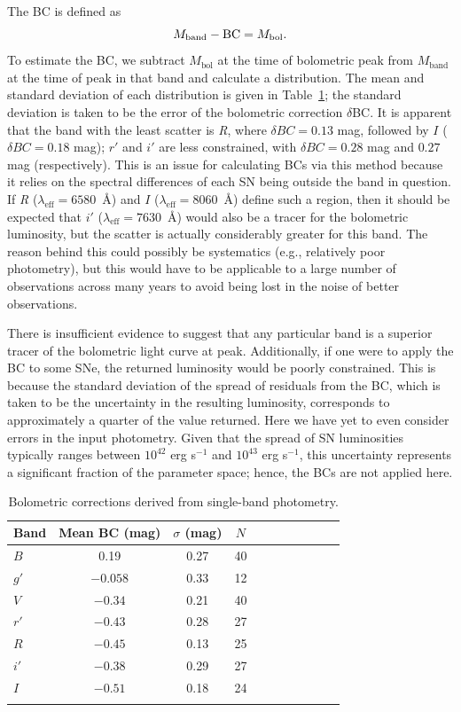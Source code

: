 \documentclass[a4paper,fleqn,usenatbib]{mnras}
\begin{document}
The BC is defined as 
\begin{equation}
M_{\mathrm{band}}-{\rm BC}=M_{\mathrm{bol}}.
\label{eq:BC}
\end{equation}
To estimate the BC, we subtract $M_{\mathrm{bol}}$ at the time of bolometric peak from $M_{\mathrm{band}}$ at the time of peak in that band and calculate a distribution.
The mean and standard deviation of each distribution is given in Table~\ref{BC}; the standard deviation is taken to be the error of the bolometric correction $\delta$BC. It is apparent that the band with the least scatter is \textit{R}, where $\delta BC=0.13$ mag, followed by $I$ ($\delta BC=0.18$ mag); $r'$ and $i'$ are less constrained, with $\delta BC=0.28$ mag and $0.27$ mag (respectively). This is an issue for calculating BCs via this method because it relies on the spectral differences of each SN being outside the band in question. If {\it R} ($\lambda_{\mathrm{eff}}=6580$~\AA) and $I$ ($\lambda_{\mathrm{eff}}=8060$~\AA) define such a region, then it should be expected that $i'$ ($\lambda_{\mathrm{eff}}=7630$~\AA) would also be a tracer for the bolometric luminosity, but the scatter is actually considerably greater for this band. The reason behind this could possibly be systematics (e.g., relatively poor photometry), but this would have to be applicable to a large number of observations across many years to avoid being lost in the noise of better observations.
 
There is insufficient evidence to suggest that any particular band is a superior tracer of the bolometric light curve at peak. Additionally, if one were to apply the BC to some SNe, the returned luminosity would be poorly constrained. This is because the standard deviation of the spread of residuals from the BC, which is taken to be the uncertainty in the resulting luminosity, corresponds to approximately a quarter of the value returned. Here we have yet to even consider errors in the input photometry. Given that the spread of SN luminosities typically ranges between $10^{42}$ erg s$^{-1}$ and $10^{43}$ erg s$^{-1}$, this uncertainty represents a significant fraction of the parameter space; hence, the BCs are not applied here.
\begin{table}
 \centering
 \begin{minipage}{70mm}
  \caption{Bolometric corrections derived from single-band photometry. }
 \begin{tabular}{@{}lccccccclcc@{}}
  \hline
 Band & Mean BC (mag) & $\sigma$ (mag) & $N$ \\
  \hline
$B$ & 0.19 & 0.27 & 40\\
$g'$ &  $-0.058$ & 0.33 & 12\\
$V$ & $-0.34$ & 0.21 & 40 \\
$r'$ & $-0.43$ & 0.28 & 27\\
$R$ & $-0.45$ & 0.13 & 25\\
$i'$ & $-0.38$ & 0.29 & 27\\
$I$ & $-0.51$ & 0.18 & 24\\

\hline
 \label{BC}
\end{tabular}
\end{minipage}
\end{table}
\end{document}
